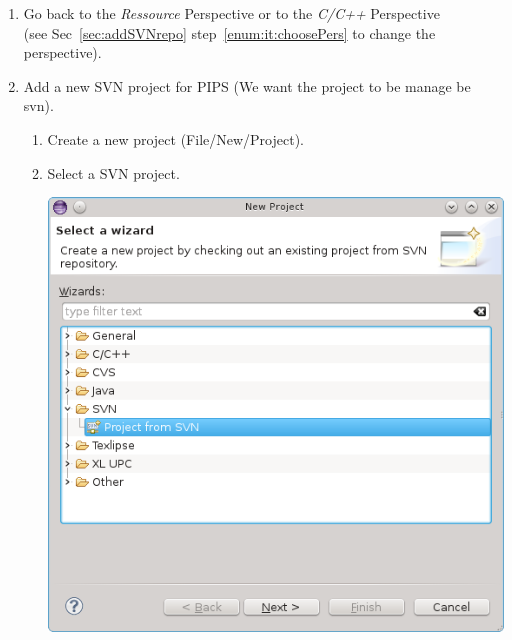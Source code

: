 \documentclass[a4paper]{article}
\begin{document}
\begin{enumerate}
\item Go back to the \emph{Ressource} Perspective or to the \emph{C/C++} Perspective \\
(see Sec~\ref{sec:addSVNrepo} step~\ref{enum:it:choosePers} to change the perspective).

\item Add a new SVN project for PIPS
(We want the project to be manage be svn).
\label{enum:it:newproject}
\begin{enumerate}
\item Create a new project (File/New/Project). 
\item Select a SVN project.
\begin{center}
\noindent
\includegraphics[scale=0.4]{eclipse/03-eclipseJUNO-newSVNProject1.png}
\end{center}


\end{enumerate}
\end{enumerate}
\end{document}
